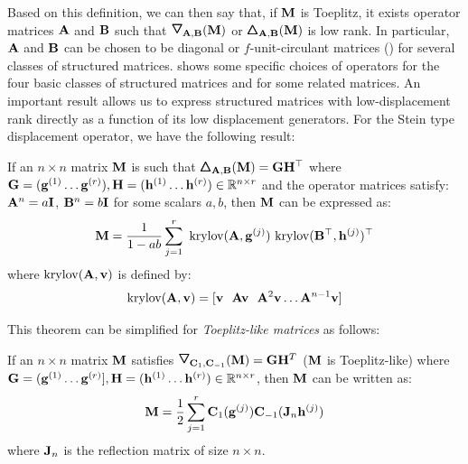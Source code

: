 \noindent
Based on this definition, we can then say that, if $\mathbf{M}$ is Toeplitz, it exists operator matrices $\mathbf{A}$ and $\mathbf{B}$ such that $\triangleopdown_{\Amat, \Bmat} (\Mmat)$ or $\pmb{\bigtriangleup}_{\mathbf{A}, \mathbf{B}} (\mathbf{M})$ is low rank.
In particular, $\mathbf{A}$ and $\mathbf{B}$ can be chosen to be diagonal or $f$-unit-circulant matrices (\eg {}) for several classes of structured matrices.
 shows some specific choices of operators for the four basic classes of structured matrices and for some related matrices.
An important result allows us to express structured matrices with low-displacement rank directly as a function of its low displacement generators.  
For the Stein type displacement operator, we have the following result:
\begin{theorem}
  If an $n \times n$ matrix $\mathbf{M}$ is such that $\pmb{\bigtriangleup}_{\mathbf{A}, \mathbf{B}}(\mathbf{M}) = \mathbf{G} \mathbf{H}^\top$ where 
  $\mathbf{G} = (\mathbf{g}^{(1)} \ldots \mathbf{g}^{(r)}), \mathbf{H} = (\mathbf{h}^{(1)} \ldots \mathbf{h}^{(r)}) \in \mathbb{R}^{n \times r}$ 
  and the operator matrices satisfy: $\mathbf{A}^n = a \mathbf{I}$, $\mathbf{B}^n = b \mathbf{I}$ for some scalars $a, b$, then $\mathbf{M}$ can be expressed as: 
  \begin{equation}
    \mathbf{M} = \frac{1}{1 - ab} \sum_{j=1}^{r} ~\mathrm{krylov}(\mathbf{A}, \mathbf{g}^{(j)}) ~\mathrm{krylov}(\mathbf{B}^\top, \mathbf{h}^{(j)})^\top
    \label{equation:ch3-krylov_decomposition}
  \end{equation}
  where $\mathrm{krylov}(\mathbf{A}, \mathbf{v})$ is defined by:
  \begin{equation}
    \mathrm{krylov}(\mathbf{A}, \mathbf{v}) = [\mathbf{v}~~\mathbf{A}\mathbf{v}~~\mathbf{A}^2 \mathbf{v} \ldots \mathbf{A}^{n-1} \mathbf{v}]
  \end{equation}
  \label{theorem:ch3-krylov_decomposition}
\end{theorem} 
\noindent
This theorem can be simplified for \emph{Toeplitz-like matrices} as follows:
\begin{theorem}
  If an $n \times n$ matrix $\mathbf{M}$ satisfies $\triangleopdown_{\Cmat_1, \Cmat_{-1}}(\Mmat) = \Gmat \Hmat^T$ ($\mathbf{M}$ is Toeplitz-like) where $\mathbf{G} = (\mathbf{g} ^{(1)} \ldots \mathbf{g}^{(r)}], \mathbf{H} = (\mathbf{h}^{(1)} \ldots \mathbf{h}^{(r)}) \in \mathbb{R}^{n \times r}$, then $\mathbf{M}$ can be written as: 
  \begin{equation} 
    \mathbf{M} = \frac{1}{2} \sum_{j=1}^{r} \mathbf{C}_1(\mathbf{g}^{(j)}) \mathbf{C}_{-1}(\mathbf{J}_n \mathbf{h}^{(j)})
    \label{equation:ch3-toeplitz_like_matrix_decomposition}
  \end{equation}
  where $\mathbf{J}_n$ is the reflection matrix of size $n \times n$.
\end{theorem}
